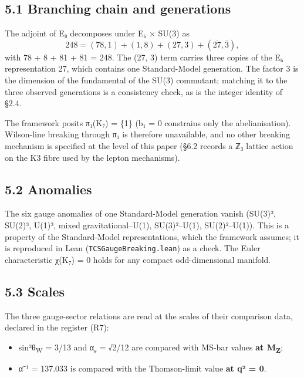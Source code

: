 \documentclass[11pt,a4paper]{article}
\begin{document}
\subsection{5.1 Branching chain and generations}\label{branching-chain-and-generations}

The adjoint of E₈ decomposes under E₆ × SU(3) as \[248 = (78, 1) + (1, 8) + (27, 3) + (\overline{27}, \overline{3}),\] with 78 + 8 + 81 + 81 = 248. The (27, 3) term carries three copies of the E₆ representation 27, which contains one Standard-Model generation. The factor 3 is the dimension of the fundamental of the SU(3) commutant; matching it to the three observed generations is a consistency check, as is the integer identity of §2.4.

The framework posits π₁(K₇) = \{1\} (b₁ = 0 constrains only the abelianisation). Wilson-line breaking through π₁ is therefore unavailable, and no other breaking mechanism is specified at the level of this paper (§6.2 records a ℤ₃ lattice action on the K3 fibre used by the lepton mechanisms).

\subsection{5.2 Anomalies}\label{anomalies}

The six gauge anomalies of one Standard-Model generation vanish (SU(3)³, SU(2)³, U(1)³, mixed gravitational--U(1), SU(3)²--U(1), SU(2)²--U(1)). This is a property of the Standard-Model representations, which the framework assumes; it is reproduced in Lean (\texttt{TCSGauge\allowbreak{}Breaking.\allowbreak{}lean}) as a check. The Euler characteristic χ(K₇) = 0 holds for any compact odd-dimensional manifold.

\subsection{5.3 Scales}\label{scales}

The three gauge-sector relations are read at the scales of their comparison data, declared in the register (R7):

\begin{itemize}
\tightlist
\item
  sin²θ\textsubscript{W} = 3/13 and α\textsubscript{s} = √2/12 are compared with MS-bar values \textbf{at M\textsubscript{Z}};
\item
  α⁻¹ = 137.033 is compared with the Thomson-limit value \textbf{at q² = 0}.
\end{itemize}
\end{document}
